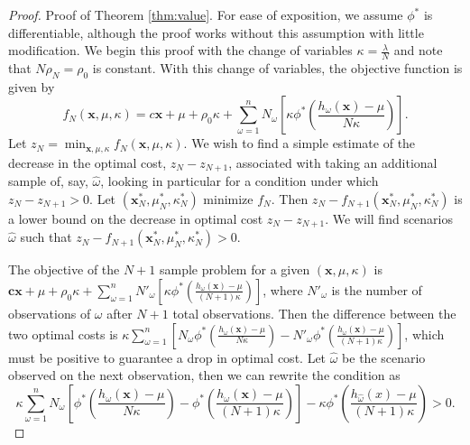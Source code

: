 \documentclass[12pt]{article}
\newcommand{\x}{\mathbf{x}}
\renewcommand{\c}{\mathbf{c}}
\theoremstyle{plain}
\theoremstyle{definition}
\theoremstyle{remark}
\begin{document}
\begin{proof}{\sc Proof of Theorem \ref{thm:value}.}
	For ease of exposition, we assume $\phi^*$ is differentiable, although the proof works without this assumption with little modification.	
	We begin this proof with the change of variables $\kappa = \frac{\lambda}{N}$ and note that $N\rho_N = \rho_0$ is constant.	
	With this change of variables, the objective function is given by
	\[
		f_N(\x,\mu,\kappa) = c\x + \mu + \rho_0 \kappa + \sum_{\omega = 1}^n N_\omega \left[ \kappa \phi^*\left(\frac{h_\omega(\x) - \mu}{N\kappa} \right) \right].
	\]
	Let $z_N = \min_{\x,\mu,\kappa} f_N(\x,\mu,\kappa)$.
	We wish to find a simple estimate of the decrease in the optimal cost, $z_N - z_{N+1}$, associated with taking an additional sample of, say, $\hat{\omega}$, looking in particular for a condition under which $z_N - z_{N+1} > 0$.	
	Let $(\x^*_N,\mu^*_N,\kappa^*_N)$ minimize $f_N$.
	Then $z_N - f_{N+1}(\x^*_N,\mu^*_N,\kappa^*_N)$ is a lower bound on the decrease in optimal cost $z_N - z_{N+1}$.
	We will find scenarios $\hat{\omega}$ such that $z_N - f_{N+1}(\x^*_N,\mu^*_N,\kappa^*_N) > 0$.

	The objective of the $N+1$ sample problem for a given $(\x,\mu,\kappa)$ is $\c\x + \mu + \rho_0 \kappa + \sum_{\omega = 1}^n N'_\omega \left[ \kappa \phi^*\left(\frac{h_\omega(\x) - \mu}{(N+1)\kappa} \right) \right]$,	where $N'_\omega$ is the number of observations of $\omega$ after $N+1$ total observations.
	Then the difference between the two optimal costs is $\kappa \sum_{\omega=1}^n \left[ N_\omega \phi^*\left(\frac{h_\omega(\x) - \mu}{N\kappa} \right) - N'_\omega \phi^*\left(\frac{h_\omega(\x) - \mu}{(N+1)\kappa} \right) \right]$, which must be positive to guarantee a drop in optimal cost.
	Let $\hat{\omega}$ be the scenario observed on the next observation, then we can rewrite the condition as
	\begin{equation} \label{eq:raw_cond}
		\kappa \sum_{\omega=1}^n N_\omega \left[ \phi^*\left(\frac{h_\omega(\x) - \mu}{N\kappa} \right) - \phi^*\left(\frac{h_\omega(\x) - \mu}{(N+1)\kappa} \right) \right] - \kappa \phi^*\left(\frac{h_{\hat{\omega}}(x) - \mu}{(N+1)\kappa}\right) > 0.
	\end{equation}


\end{proof}
\end{document}
